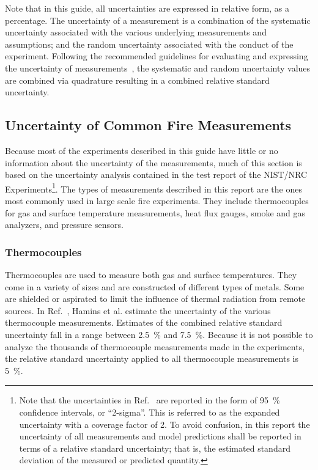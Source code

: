 Note that in this guide, all uncertainties are expressed in relative form, as a percentage. The uncertainty of a measurement is a combination of the systematic uncertainty associated with the various underlying measurements and assumptions; and the random uncertainty associated with the conduct of the experiment. Following the recommended guidelines for evaluating and expressing the uncertainty of measurements~\cite{Taylor&Kuyatt:1994}, the systematic and random uncertainty values are combined via quadrature resulting in a combined relative standard uncertainty.

\subsection{Uncertainty of Common Fire Measurements}

Because most of the experiments described in this guide have little or no information about the uncertainty of the measurements, much of this section is based on the uncertainty analysis contained in the test report of the NIST/NRC Experiments\footnote{Note that the uncertainties in Ref.~\cite{Hamins:SP1013-1} are reported in the form of 95~\% confidence intervals, or ``2-sigma''. This is referred to as the expanded uncertainty with a coverage factor of 2. To avoid confusion, in this report the uncertainty of all measurements and model predictions shall be reported in terms of a relative standard uncertainty; that is, the estimated standard deviation of the measured or predicted quantity.}. The types of measurements described in this report are the ones most commonly used in large scale fire experiments. They include thermocouples for gas and surface temperature measurements, heat flux gauges, smoke and gas analyzers, and pressure sensors.

\subsubsection{Thermocouples}

Thermocouples are used to measure both gas and surface temperatures. They come in a variety of sizes and are constructed of different types of metals. Some are shielded or aspirated to limit the influence of thermal radiation from remote sources. In Ref.~\cite{Hamins:SP1013-1}, Hamins et al. estimate the uncertainty of the various thermocouple measurements. Estimates of the combined relative standard uncertainty fall in a range between 2.5~\% and 7.5~\%. Because it is not possible to analyze the thousands of thermocouple measurements made in the experiments, the relative standard uncertainty applied to all thermocouple measurements is 5~\%.

